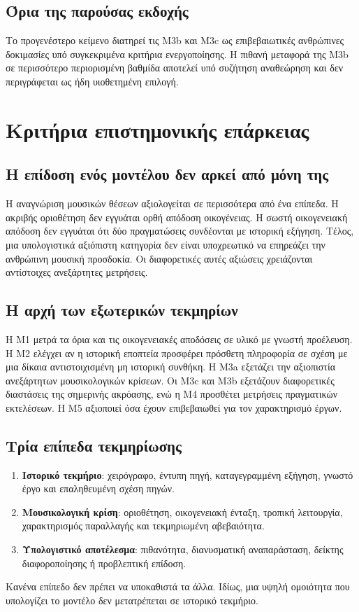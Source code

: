 \documentclass[11pt,a4paper]{extarticle}
\begin{document}
\subsection*{Όρια της παρούσας εκδοχής}
Το προγενέστερο κείμενο διατηρεί τις M3b και M3c ως επιβεβαιωτικές ανθρώπινες δοκιμασίες υπό συγκεκριμένα κριτήρια ενεργοποίησης. Η πιθανή μεταφορά της M3b σε περισσότερο περιορισμένη βαθμίδα αποτελεί υπό συζήτηση αναθεώρηση και δεν περιγράφεται ως ήδη υιοθετημένη επιλογή.


\section{Κριτήρια επιστημονικής επάρκειας}

\subsection*{Η επίδοση ενός μοντέλου δεν αρκεί από μόνη της}
Η αναγνώριση μουσικών θέσεων αξιολογείται σε περισσότερα από ένα επίπεδα. Η ακριβής οριοθέτηση δεν εγγυάται ορθή απόδοση οικογένειας. Η σωστή οικογενειακή απόδοση δεν εγγυάται ότι δύο πραγματώσεις συνδέονται με ιστορική εξήγηση. Τέλος, μια υπολογιστικά αξιόπιστη κατηγορία δεν είναι υποχρεωτικό να επηρεάζει την ανθρώπινη μουσική προσδοκία. Οι διαφορετικές αυτές αξιώσεις χρειάζονται αντίστοιχες ανεξάρτητες μετρήσεις.

\subsection*{Η αρχή των εξωτερικών τεκμηρίων}
Η M1 μετρά τα όρια και τις οικογενειακές αποδόσεις σε υλικό με γνωστή προέλευση. Η M2 ελέγχει αν η ιστορική εποπτεία προσφέρει πρόσθετη πληροφορία σε σχέση με μια δίκαια αντιστοιχισμένη μη ιστορική συνθήκη. Η M3a εξετάζει την αξιοπιστία ανεξάρτητων μουσικολογικών κρίσεων. Οι M3c και M3b εξετάζουν διαφορετικές διαστάσεις της σημερινής ακρόασης, ενώ η M4 προσθέτει μετρήσεις πραγματικών εκτελέσεων. Η M5 αξιοποιεί όσα έχουν επιβεβαιωθεί για τον χαρακτηρισμό έργων.

\subsection*{Τρία επίπεδα τεκμηρίωσης}
\begin{enumerate}
\item \textbf{Ιστορικό τεκμήριο}: χειρόγραφο, έντυπη πηγή, καταγεγραμμένη εξήγηση, γνωστό έργο και επαληθευμένη σχέση πηγών.
\item \textbf{Μουσικολογική κρίση}: οριοθέτηση, οικογενειακή ένταξη, τροπική λειτουργία, χαρακτηρισμός παραλλαγής και τεκμηριωμένη αβεβαιότητα.
\item \textbf{Υπολογιστικό αποτέλεσμα}: πιθανότητα, διανυσματική αναπαράσταση, δείκτης διαφοροποίησης ή προβλεπτική επίδοση.
\end{enumerate}
Κανένα επίπεδο δεν πρέπει να υποκαθιστά τα άλλα. Ιδίως, μια υψηλή ομοιότητα που υπολογίζει το μοντέλο δεν μετατρέπεται σε ιστορικό τεκμήριο.
\end{document}
